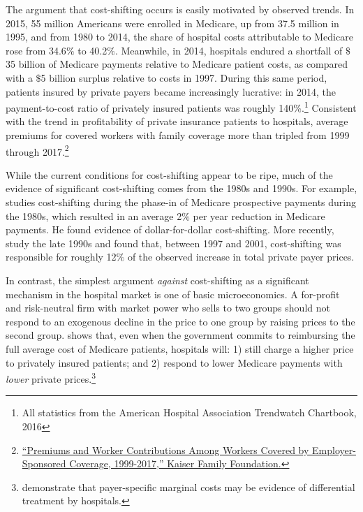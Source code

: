 \documentclass[12pt]{article}
\begin{document}
The argument that cost-shifting occurs is easily motivated by observed trends.  In 2015, 55 million Americans were enrolled in Medicare, up from 37.5 million in 1995, and from 1980 to 2014, the share of hospital costs attributable to Medicare rose from 34.6$\%$ to 40.2$\%$.  Meanwhile, in 2014, hospitals endured a shortfall of $\$$35 billion of Medicare payments relative to Medicare patient costs, as compared with a $\$$5 billion surplus relative to costs in 1997.  During this same period, patients insured by private payers became increasingly lucrative: in 2014, the payment-to-cost ratio of privately insured patients was roughly 140$\%$.\footnote{All statistics from the American Hospital Association Trendwatch Chartbook, 2016} Consistent with the trend in profitability of private insurance patients to hospitals, average premiums for covered workers with family coverage more than tripled from 1999 through 2017.\footnote{\href{https://www.kff.org/interactive/premiums-and-worker-contributions/?coverageGroup=family}{``Premiums and Worker Contributions Among Workers Covered by Employer-Sponsored Coverage, 1999-2017,'' Kaiser Family Foundation.}}

While the current conditions for cost-shifting appear to be ripe, much of the evidence of significant cost-shifting comes from the 1980s and 1990s.  For example, \cite{cutler1998costshift} studies cost-shifting during the phase-in of Medicare prospective payments during the 1980s, which resulted in an average 2$\%$ per year reduction in Medicare payments.  He found evidence of dollar-for-dollar cost-shifting.  More recently, \cite{zwanziger2006} study the late 1990s and found that, between 1997 and 2001, cost-shifting was responsible for roughly 12$\%$ of the observed increase in total private payer prices.

In contrast, the simplest argument \textit{against} cost-shifting as a significant mechanism in the hospital market is one of basic microeconomics.  A for-profit and risk-neutral firm with market power who sells to two groups should not respond to an exogenous decline in the price to one group by raising prices to the second group.  \cite{hay1983} shows that, even when the government commits to reimbursing the full average cost of Medicare patients, hospitals will: 1) still charge a higher price to privately insured patients; and 2) respond to lower Medicare payments with \textit{lower} private prices.\footnote{\cite{dor1996} demonstrate that payer-specific marginal costs may be evidence of differential treatment by hospitals.}
\end{document}
